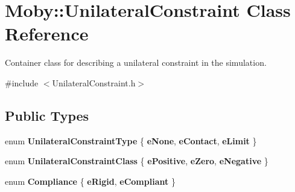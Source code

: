 \section{Moby\-:\-:Unilateral\-Constraint Class Reference}
\label{classMoby_1_1UnilateralConstraint}


Container class for describing a unilateral constraint in the simulation.  




{\ttfamily \#include $<$Unilateral\-Constraint.\-h$>$}

\subsection*{Public Types}
\begin{DoxyCompactItemize}
\item 
enum {\bfseries Unilateral\-Constraint\-Type} \{ {\bfseries e\-None}, 
{\bfseries e\-Contact}, 
{\bfseries e\-Limit}
 \}
\item 
enum {\bfseries Unilateral\-Constraint\-Class} \{ {\bfseries e\-Positive}, 
{\bfseries e\-Zero}, 
{\bfseries e\-Negative}
 \}
\item 
enum {\bfseries Compliance} \{ {\bfseries e\-Rigid}, 
{\bfseries e\-Compliant}
 \}
\end{DoxyCompactItemize}
